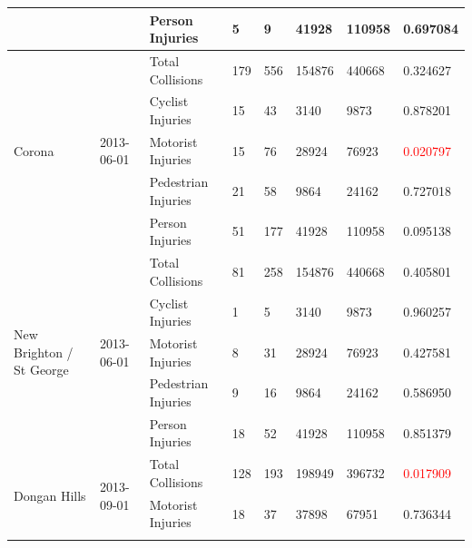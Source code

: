 \documentclass[10pt,journal,compsoc]{IEEEtran}
\begin{document}
\begin{table}[]
\begin{tabular}{|l|l|l|l|l|l|l|l|}
                                               &                             & Person Injuries     & 5         & 9        & 41928      & 110958    & 0.697084 \\ \hline
\multirow{5}{*}{Corona}                        & \multirow{5}{*}{2013-06-01} & Total Collisions    & 179       & 556      & 154876     & 440668    & 0.324627 \\ \cline{3-8} 
                                               &                             & Cyclist Injuries    & 15        & 43       & 3140       & 9873      & 0.878201 \\ \cline{3-8} 
                                               &                             & Motorist Injuries   & 15        & 76       & 28924      & 76923     & \textcolor{red}{0.020797} \\ \cline{3-8} 
                                               &                             & Pedestrian Injuries & 21        & 58       & 9864       & 24162     & 0.727018 \\ \cline{3-8} 
                                               &                             & Person Injuries     & 51        & 177      & 41928      & 110958    & 0.095138 \\ \hline
\multirow{5}{*}{New Brighton / St George}      & \multirow{5}{*}{2013-06-01} & Total Collisions    & 81        & 258      & 154876     & 440668    & 0.405801 \\ \cline{3-8} 
                                               &                             & Cyclist Injuries    & 1         & 5        & 3140       & 9873      & 0.960257 \\ \cline{3-8} 
                                               &                             & Motorist Injuries   & 8         & 31       & 28924      & 76923     & 0.427581 \\ \cline{3-8} 
                                               &                             & Pedestrian Injuries & 9         & 16       & 9864       & 24162     & 0.586950 \\ \cline{3-8} 
                                               &                             & Person Injuries     & 18        & 52       & 41928      & 110958    & 0.851379 \\ \hline
\multirow{4}{*}{Dongan Hills}                  & \multirow{4}{*}{2013-09-01} & Total Collisions    & 128       & 193      & 198949     & 396732    & \textcolor{red}{0.017909} \\ \cline{3-8} 
                                               &                             & Motorist Injuries   & 18        & 37       & 37898      & 67951     & 0.736344 \\ \cline{3-8} 

\end{tabular}
\end{table}
\end{document}
